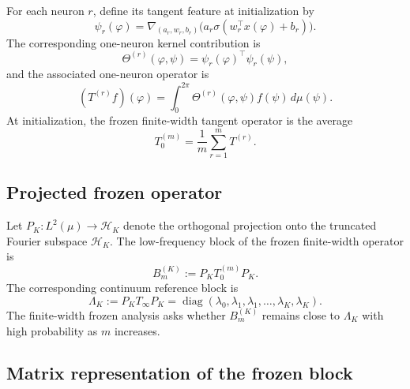 For each neuron \(r\), define its tangent feature at initialization by
\begin{equation}
	\psi_r(\varphi)
	=
	\nabla_{(a_r,w_r,b_r)}
	\bigl(a_r\sigma(w_r^\top x(\varphi)+b_r)\bigr).
	\label{eq:method-one-neuron-tangent-feature}
\end{equation}
The corresponding one-neuron kernel contribution is
\begin{equation}
	\Theta^{(r)}(\varphi,\psi)
	=
	\psi_r(\varphi)^\top \psi_r(\psi),
	\label{eq:method-one-neuron-kernel}
\end{equation}
and the associated one-neuron operator is
\begin{equation}
	(T^{(r)}f)(\varphi)
	=
	\int_0^{2\pi}\Theta^{(r)}(\varphi,\psi)f(\psi)\,d\mu(\psi).
	\label{eq:method-one-neuron-operator}
\end{equation}
At initialization, the frozen finite-width tangent operator is the average
\begin{equation}
	T_0^{(m)}=\frac1m\sum_{r=1}^m T^{(r)}.
	\label{eq:method-finite-width-frozen-average}
\end{equation}

\subsection{Projected frozen operator}

Let \( P_K:L^2(\mu)\to \mathcal H_K \)
denote the orthogonal projection onto the truncated Fourier subspace
\(\mathcal H_K\). The low-frequency block of the frozen finite-width operator is
\begin{equation}
	B_m^{(K)}:=P_KT_0^{(m)}P_K.
	\label{eq:method-finite-width-block}
\end{equation}
The corresponding continuum reference block is
\begin{equation}
	\Lambda_K:=P_KT_\infty P_K
	=
	\operatorname{diag}(\lambda_0,\lambda_1,\lambda_1,\dots,\lambda_K,\lambda_K).
	\label{eq:method-continuum-fourier-block}
\end{equation}
The finite-width frozen analysis asks whether \(B_m^{(K)}\) remains close to \(\Lambda_K\)
with high probability as \(m\) increases.

\subsection{Matrix representation of the frozen block}

